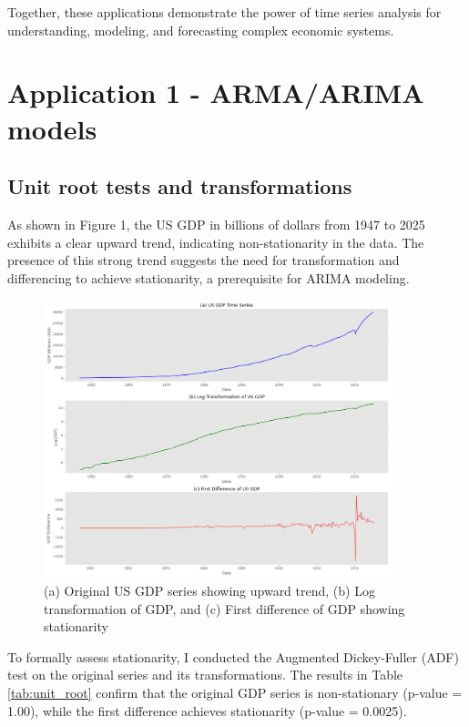 \documentclass[11pt,a4paper]{article}
\begin{document}
Together, these applications demonstrate the power of time series analysis for understanding, modeling, and forecasting complex economic systems.

\section{Application 1 - ARMA/ARIMA models}

\subsection{Unit root tests and transformations}

As shown in Figure 1, the US GDP in billions of dollars from 1947 to 2025 exhibits a clear upward trend, indicating non-stationarity in the data. The presence of this strong trend suggests the need for transformation and differencing to achieve stationarity, a prerequisite for ARIMA modeling.

\begin{figure}[H]
    \centering
    \includegraphics[width=0.9\textwidth]{plots/arima/gdp/figure1_transformations.png}
    \caption{(a) Original US GDP series showing upward trend, (b) Log transformation of GDP, and (c) First difference of GDP showing stationarity}
    \label{fig:gdp_transformations}
\end{figure}

To formally assess stationarity, I conducted the Augmented Dickey-Fuller (ADF) test on the original series and its transformations. The results in Table \ref{tab:unit_root} confirm that the original GDP series is non-stationary (p-value = 1.00), while the first difference achieves stationarity (p-value = 0.0025).
\end{document}
